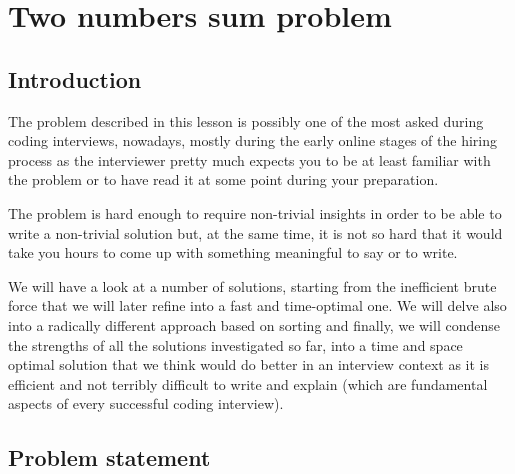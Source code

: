 %


\chapter{Two numbers sum problem}
\label{ch:two_numbers_sum}
\section*{Introduction}
The problem described in this lesson is possibly one of the most asked during coding interviews, nowadays, mostly 
during the early online stages of the hiring process as the interviewer pretty much expects you to be at least familiar with the problem or to have read it at some point during your preparation.

The problem is hard enough to require non-trivial insights in order to be able to write a non-trivial solution but, at the same time, it is not so hard that it would take you hours to come up with something meaningful to say or to write.

We will have a look at a number of solutions, starting from the inefficient brute force that we will later refine into a fast and time-optimal one.
We will delve also into a radically different approach based on sorting and finally, we will condense the strengths of all the solutions investigated so far, into a time and space optimal solution that we think would do better in an interview context as it is efficient and not terribly difficult to write and explain (which are fundamental aspects of every successful coding interview).


\section{Problem statement}

